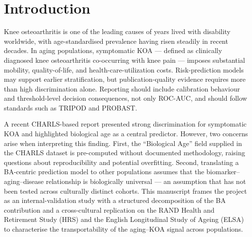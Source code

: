 \documentclass[11pt,a4paper]{article}
\begin{document}
\begin{abstract}
\textbf{Conclusions.} The biomarker--BA--KOA relationship is population-specific: BA is
a weak standalone KOA predictor ($r=0.02$--$0.04$) even in CHARLS, and demographic-predicted
BA adds negligible signal to external cohorts. The dominant driver of performance
degradation across populations is cross-cultural --- outcome definition heterogeneity,
diagnostic ascertainment, and population demographic differences --- not the absence of
Biological Age or the choice of BA computation method. These findings reframe the external
validation challenge: the primary obstacle is not a missing feature but a non-transferable
disease--aging relationship.

\textbf{Keywords:} symptomatic KOA, machine learning, biological age, KDM, cross-cultural
transportability, TRIPOD, calibration, DCA, HRS, ELSA
\end{abstract}

\section{Introduction}
Knee osteoarthritis is one of the leading causes of years lived with disability worldwide, with
age-standardised prevalence having risen steadily in recent decades\cite{Safiri2020}. In aging
populations, symptomatic KOA --- defined as clinically diagnosed knee osteoarthritis co-occurring with
knee pain --- imposes substantial mobility, quality-of-life, and health-care-utilization costs.
Risk-prediction models may support earlier stratification, but publication-quality evidence requires
more than high discrimination alone. Reporting should include calibration behaviour and threshold-level
decision consequences, not only ROC-AUC, and should follow standards such as TRIPOD\cite{Collins2015}
and PROBAST\cite{Wolff2019}.

A recent CHARLS-based report\cite{Fu2025} presented strong discrimination for symptomatic KOA and
highlighted biological age as a central predictor. However, two concerns arise when interpreting
this finding. First, the ``Biological Age'' field supplied in the CHARLS dataset is pre-computed
without documented methodology, raising questions about reproducibility and potential overfitting.
Second, translating a BA-centric prediction model to other populations assumes that the
biomarker--aging--disease relationship is biologically universal --- an assumption that has not been
tested across culturally distinct cohorts. This manuscript frames the project as an internal-validation
study with a structured decomposition of the BA contribution and a cross-cultural replication on the
RAND Health and Retirement Study (HRS) and the English Longitudinal Study of Ageing (ELSA) to
characterise the transportability of the aging--KOA signal across populations.
\end{document}
